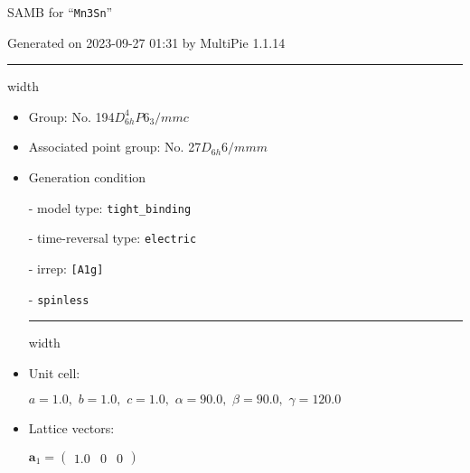 \documentclass[fleqn,10pt,landscape]{article}
\begin{document}
\setcounter{MaxMatrixCols}{16}

\setlength{\baselineskip}{16pt}
\footnotesize
\begin{center}
\LARGE
SAMB for ``\texttt{Mn3Sn}''
\end{center}
\begin{flushright}
Generated on 2023-09-27 01:31 by MultiPie 1.1.14
\end{flushright}
\vspace{1cm}


 \hfil \hrule height 1mm width \textwidth \hfil

\begin{itemize}
\item Group: No. 194\quad$D_{6h}^{4}$\quad$P6_3/mmc$\quad[ hexagonal ]

\item Associated point group: No. 27\quad$D_{6h}$\quad$6/mmm$\quad[ hexagonal ]

\vspace{5mm}

\item Generation condition

\quad - model type: \texttt{tight_binding}

\quad - time-reversal type: \texttt{electric}

\quad - irrep: \texttt{[A1g]}

\quad - \texttt{spinless}


 \hfil \hrule height 1mm width \textwidth \hfil

\item Unit cell:

\quad $a=1.0,\,\, b=1.0,\,\, c=1.0,\,\, \alpha=90.0,\,\, \beta=90.0,\,\, \gamma=120.0$

\item Lattice vectors:

\quad $\bm{a}_1=\begin{pmatrix} 1.0 & 0 & 0 \end{pmatrix}$


\end{itemize}
\end{document}
